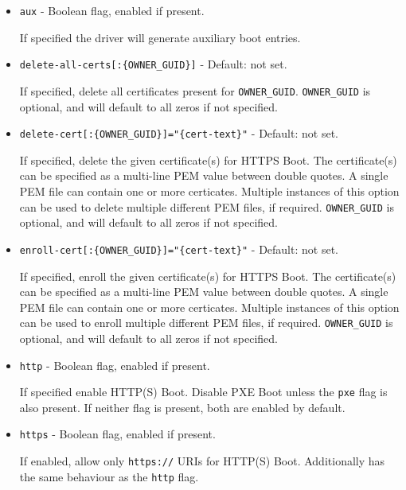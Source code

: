 \documentclass[]{article}
\begin{document}
\begin{itemize}
  \item \texttt{aux} - Boolean flag, enabled if present. \medskip

  If specified the driver will generate auxiliary boot entries. \medskip

  \item \texttt{delete-all-certs[:\{OWNER\_GUID\}]} - Default: not set. \medskip

  If specified, delete all certificates present for \texttt{OWNER\_GUID}.
  \texttt{OWNER\_GUID} is optional, and will default to all zeros if not specified.
  \medskip

  \item \texttt{delete-cert[:\{OWNER\_GUID\}]="\{cert-text\}"} - Default: not set. \medskip

  If specified, delete the given certificate(s) for HTTPS Boot. The certificate(s) can be specified
  as a multi-line PEM value between double quotes.
  A single PEM file can contain one or more certicates.
  Multiple instances of this option can be used to delete multiple different
  PEM files, if required.
  \texttt{OWNER\_GUID} is optional, and will default to all zeros if not specified.
  \medskip

  \item \texttt{enroll-cert[:\{OWNER\_GUID\}]="\{cert-text\}"} - Default: not set. \medskip

  If specified, enroll the given certificate(s) for HTTPS Boot. The certificate(s) can be specified
  as a multi-line PEM value between double quotes.
  A single PEM file can contain one or more certicates.
  Multiple instances of this option can be used to enroll multiple different
  PEM files, if required.
  \texttt{OWNER\_GUID} is optional, and will default to all zeros if not specified.
  \medskip

  \item \texttt{http} - Boolean flag, enabled if present. \medskip

  If specified enable HTTP(S) Boot. Disable PXE Boot unless
  the \texttt{pxe} flag is also present. If neither flag is
  present, both are enabled by default. \medskip

  \item \texttt{https} - Boolean flag, enabled if present. \medskip

  If enabled, allow only \texttt{https://} URIs for HTTP(S) Boot.
  Additionally has the same behaviour as the \texttt{http} flag. \medskip


\end{itemize}
\end{document}
